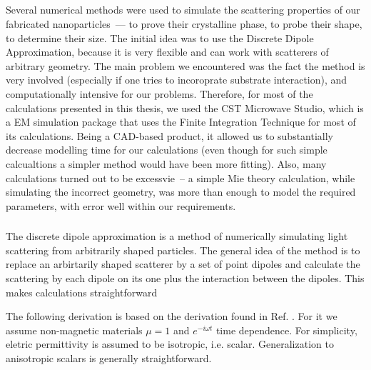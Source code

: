     \subsection{}
    \label{sec:Numeric}
        Several numerical methods were used to simulate the scattering properties of our fabricated nanoparticles~--- to prove their
        crystalline phase, to probe their shape, to determine their size. The initial idea was to use the Discrete Dipole Approximation,
        because it is very flexible and can work with scatterers of arbitrary geometry. The main problem we encountered was the fact
        the method is very involved (especially if one tries to incoroprate substrate interaction), and computationally intensive for
        our problems. Therefore, for most of the calculations presented in this thesis, we used the CST Microwave Studio, which is a
        EM simulation package that uses the Finite Integration Technique for most of its calculations. Being a CAD-based product, it
        allowed us to substantially decrease modelling time for our calculations (even though for such simple calcualtions a simpler
        method would have been more fitting). Also, many calculations turned out to be excessvie~-- a simple Mie theory calculation,
        while simulating the incorrect geometry, was more than enough to model the required parameters, with error well within our
        requirements.

        \subsubsection{}
        \label{subsec:DDA}

            The discrete dipole approximation is a method of numerically simulating light scattering from arbitrarily shaped particles.
            The general idea of the method is to replace an arbirtarily shaped scatterer by a set of point dipoles and calculate the
            scattering by each dipole on its one plus the interaction between the dipoles. This makes calculations straightforward

            The following derivation is based on the derivation found in Ref. \cite{yurkin2007discrete}. For it we assume
            non-magnetic materials $\mu = 1$ and $e^{-i\omega t}$ time dependence. For simplicity, eletric permittivity is assumed
            to be isotropic, i.e. scalar. Generalization to anisotropic scalars is generally straightforward.

